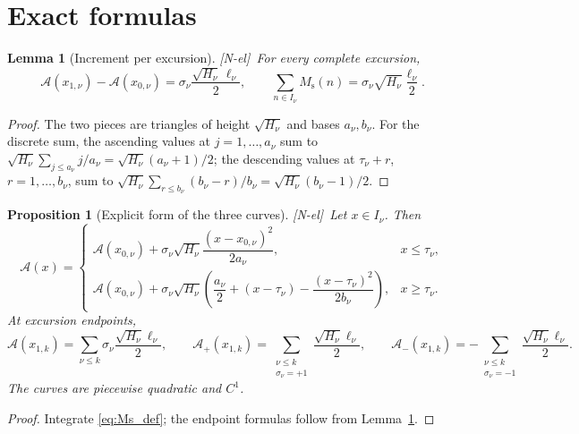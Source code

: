 \documentclass[11pt,reqno]{amsart}
\numberwithin{equation}{section}
\theoremstyle{plain}
\newtheorem{proposition}[theorem]{Proposition}
\newtheorem{lemma}[theorem]{Lemma}
\theoremstyle{definition}
\theoremstyle{remark}
\newcommand{\Ms}{M_{\mathrm{s}}}
\newcommand{\Ap}{\mathcal{A}_{+}}
\newcommand{\Am}{\mathcal{A}_{-}}
\newcommand{\Anet}{\mathcal{A}}
\newcommand{\tagNE}{\textup{[N-el]}}
\begin{document}
\section{Exact formulas}
\label{sec:formulas}

\begin{lemma}[Increment per excursion]
\label{lem:jump}
\tagNE\ For every complete excursion,
\begin{equation}
\label{eq:jump}
\Anet(x_{1,\nu})-\Anet(x_{0,\nu})
=\sigma_\nu\frac{\sqrt{H_\nu}\,\ell_\nu}{2},
\qquad
\sum_{n\in I_\nu}\Ms(n)
=\sigma_\nu\sqrt{H_\nu}\frac{\ell_\nu}{2}.
\end{equation}
\end{lemma}

\begin{proof}
The two pieces are triangles of height $\sqrt{H_\nu}$ and bases $a_\nu,b_\nu$.
For the discrete sum, the ascending values at $j=1,\ldots,a_\nu$ sum to
$\sqrt{H_\nu}\sum_{j\le a_\nu}j/a_\nu=\sqrt{H_\nu}(a_\nu+1)/2$; the
descending values at $\tau_\nu+r$, $r=1,\ldots,b_\nu$, sum to
$\sqrt{H_\nu}\sum_{r\le b_\nu}(b_\nu-r)/b_\nu=\sqrt{H_\nu}(b_\nu-1)/2$.
\end{proof}

\begin{proposition}[Explicit form of the three curves]
\label{prop:explicit}
\tagNE\ Let $x\in I_\nu$. Then
\begin{equation}
\label{eq:explicit_A}
\Anet(x)=
\begin{cases}
\Anet(x_{0,\nu})+\sigma_\nu\sqrt{H_\nu}
\dfrac{(x-x_{0,\nu})^2}{2a_\nu},&x\le\tau_\nu,\\[2ex]
\Anet(x_{0,\nu})+\sigma_\nu\sqrt{H_\nu}
\left(\dfrac{a_\nu}{2}+(x-\tau_\nu)-
\dfrac{(x-\tau_\nu)^2}{2b_\nu}\right),&x\ge\tau_\nu.
\end{cases}
\end{equation}
At excursion endpoints,
\begin{equation}
\label{eq:explicit_net}
\Anet(x_{1,k})=\sum_{\nu\le k}\sigma_\nu\frac{\sqrt{H_\nu}\ell_\nu}{2},\qquad
\Ap(x_{1,k})=\sum_{\substack{\nu\le k\\\sigma_\nu=+1}}
\frac{\sqrt{H_\nu}\ell_\nu}{2},\qquad
\Am(x_{1,k})=-\sum_{\substack{\nu\le k\\\sigma_\nu=-1}}
\frac{\sqrt{H_\nu}\ell_\nu}{2}.
\end{equation}
The curves are piecewise quadratic and $C^1$.
\end{proposition}

\begin{proof}
Integrate \eqref{eq:Ms_def}; the endpoint formulas follow from
Lemma~\ref{lem:jump}.
\end{proof}
\end{document}
